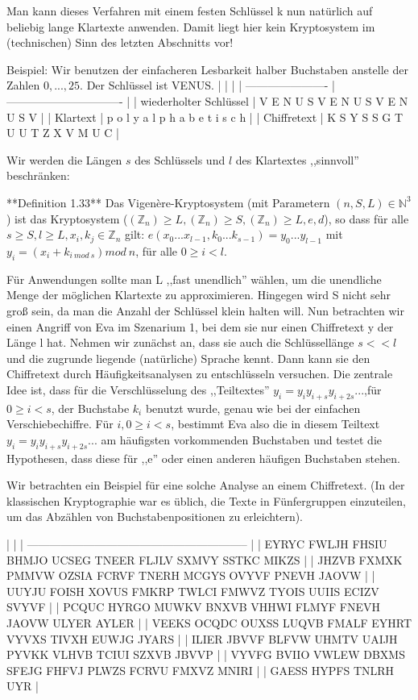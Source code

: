 \documentclass[a4paper]{article}
\begin{document}
\begin{multicols}{3}
    Man kann dieses Verfahren mit einem festen Schlüssel k nun natürlich auf beliebig lange Klartexte anwenden. Damit liegt hier kein Kryptosystem im (technischen) Sinn des letzten Abschnitts vor!

    Beispiel: Wir benutzen der einfacheren Lesbarkeit halber Buchstaben anstelle der Zahlen $0,...,25$. Der Schlüssel ist VENUS.
    |                        |                                 |
    | ---------------------- | ------------------------------- |
    | wiederholter Schlüssel | V E N U S V E N U S V E N U S V |
    | Klartext               | p o l y a l p h a b e t i s c h |
    | Chiffretext            | K S Y S S G T U U T Z X V M U C |

    Wir werden die Längen $s$ des Schlüssels und $l$ des Klartextes ,,sinnvoll'' beschränken:

    **Definition 1.33** Das Vigenère-Kryptosystem (mit Parametern $(n,S,L)\in\mathbb{N}^3$) ist das Kryptosystem ($(\mathbb{Z}_n)\geq L,(\mathbb{Z}_n)\geq S,(\mathbb{Z}_n)\geq L,e,d$), so dass für alle $s\geq S,l\geq L,x_i,k_j\in\mathbb{Z}_n$ gilt: $e(x_0...x_{l-1},k_0 ...k_{s-1})=y_0 ...y_{l-1}$ mit $y_i=(x_i+k_{i\ mod\ s}) mod\ n$, für alle $0\geq i < l$.

    Für Anwendungen sollte man L ,,fast unendlich'' wählen, um die unendliche Menge der möglichen Klartexte zu approximieren. Hingegen wird S nicht sehr groß sein, da man die Anzahl der Schlüssel klein halten will.
    Nun betrachten wir einen Angriff von Eva im Szenarium 1, bei dem sie nur einen Chiffretext y der Länge l hat. Nehmen wir zunächst an, dass sie auch die Schlüssellänge $s<<l$ und die zugrunde liegende (natürliche) Sprache kennt. Dann kann sie den Chiffretext durch Häufigkeitsanalysen zu entschlüsseln versuchen. Die zentrale Idee ist, dass für die Verschlüsselung des ,,Teiltextes'' $y_i=y_iy_{i+s}y_{i+2s}...$,für $0\geq i<s$, der Buchstabe $k_i$ benutzt wurde, genau wie bei der einfachen Verschiebechiffre. Für $i,0\geq i<s$, bestimmt Eva also die in diesem Teiltext $y_i=y_iy_{i+s}y_{i+2s}...$ am häufigsten vorkommenden Buchstaben und testet die Hypothesen, dass diese für ,,e'' oder einen anderen häufigen Buchstaben stehen.

    Wir betrachten ein Beispiel für eine solche Analyse an einem Chiffretext. (In der klassischen Kryptographie war es üblich, die Texte in Fünfergruppen einzuteilen, um das Abzählen von Buchstabenpositionen zu erleichtern).

    |                                                             |
    | ----------------------------------------------------------- |
    | EYRYC FWLJH FHSIU BHMJO UCSEG TNEER FLJLV SXMVY SSTKC MIKZS |
    | JHZVB FXMXK PMMVW OZSIA FCRVF TNERH MCGYS OVYVF PNEVH JAOVW |
    | UUYJU FOISH XOVUS FMKRP TWLCI FMWVZ TYOIS UUIIS ECIZV SVYVF |
    | PCQUC HYRGO MUWKV BNXVB VHHWI FLMYF FNEVH JAOVW ULYER AYLER |
    | VEEKS OCQDC OUXSS LUQVB FMALF EYHRT VYVXS TIVXH EUWJG JYARS |
    | ILIER JBVVF BLFVW UHMTV UAIJH PYVKK VLHVB TCIUI SZXVB JBVVP |
    | VYVFG BVIIO VWLEW DBXMS SFEJG FHFVJ PLWZS FCRVU FMXVZ MNIRI |
    | GAESS HYPFS TNLRH UYR                                       |


\end{multicols}
\end{document}
